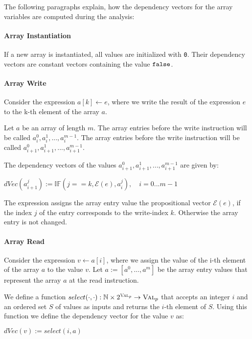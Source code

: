 The following paragraphs explain, how the dependency vectors for the array variables are computed during the analysis:

\paragraph{Array Instantiation}
If a new array is instantiated, all values are initialized with \texttt{0}. Their dependency vectors are constant vectors containing the value $\mathtt{false}$.

\paragraph{Array Write}
Consider the expression $a[k] \leftarrow e$, where we write the result of the expression $e$ to the k-th element of the array $a$.

Let $a$ be an array of length $m$. The array entries before the write instruction will be called $a_i^0, a_i^1,..., a_i^{m-1}$.  The array entries before the write instruction will be called $a_{i+1}^0, a_{i+1}^1,..., a_{i+1}^{m-1}$.

The dependency vectors of the values $a_{i+1}^0, a_{i+1}^1,..., a_{i+1}^{m-1}$ are given by:
\begin{center}
    $dVec(a_{i+1}^j) := \mathbb{IF}(j == k, \mathcal{E}(e), a_i^j), \quad i = 0...m-1$
\end{center}
The expression assigns the array entry value the propositional vector $\mathcal{E}(e)$, if the index $j$ of the entry corresponds to the write-index $k$. Otherwise the array entry is not changed.

\paragraph{Array Read}
Consider the expression $v \leftarrow a[i]$, where we assign the value of the i-th element of the array $a$ to the value $v$.
Let $a := [a^0, ..., a^m]$ be the array entry values that represent the array $a$ at the read instruction.

We define a function $select(\cdot, \cdot): \mathbb{N} \times 2^{\textsc{Val}_p} \to \textsc{Val}_p$ that accepts an integer $i$ and an ordered set $S$ of values as inputs and returns the $i$-th element of $S$. Using this function we define the dependency vector for the value $v$ as:
\begin{center}
    $dVec(v) := select(i, a)$
\end{center}